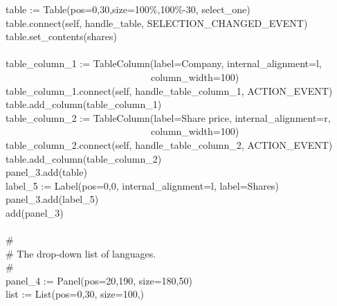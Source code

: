 {\>   \ \ \ table :=
Table({\textquotedbl}pos=0,30{\textquotedbl},{\textquotedbl}size=100\%,100\%-30{\textquotedbl},
{\textquotedbl}select\_one{\textquotedbl}) \\
\>   \ \ \ table.connect(self,
{\textquotedbl}handle\_table{\textquotedbl},
SELECTION\_CHANGED\_EVENT) \\
\>   \ \ \ table.set\_contents(shares) \\
\ \\
\>   \ \ \ table\_column\_1 :=
TableColumn({\textquotedbl}label=Company{\textquotedbl},
{\textquotedbl}internal\_alignment=l{\textquotedbl}, \\
\>   \ \ \ \ \ \ \ \ \ \ \ \ \ \ \ \ \ \ \ \ \ \ \ \ \ \ \ \ \ \ \ \ \ {\textquotedbl}column\_width=100{\textquotedbl}) \\
\>   \ \ \ table\_column\_1.connect(self,
{\textquotedbl}handle\_table\_column\_1{\textquotedbl}, ACTION\_EVENT) \\
\>   \ \ \ table.add\_column(table\_column\_1) \\
\>   \ \ \ table\_column\_2 := TableColumn({\textquotedbl}label=Share
price{\textquotedbl},
{\textquotedbl}internal\_alignment=r{\textquotedbl}, \\
\>   \ \ \ \ \ \ \ \ \ \ \ \ \ \ \ \ \ \ \ \ \ \ \ \ \ \ \ \ \ \ \ \ \ {\textquotedbl}column\_width=100{\textquotedbl}) \\
\>   \ \ \ table\_column\_2.connect(self,
{\textquotedbl}handle\_table\_column\_2{\textquotedbl}, ACTION\_EVENT) \\
\>   \ \ \ table.add\_column(table\_column\_2) \\
\>   \ \ \ panel\_3.add(table) \\
\>   \ \ \ label\_5 := Label({\textquotedbl}pos=0,0{\textquotedbl},
{\textquotedbl}internal\_alignment=l{\textquotedbl},
{\textquotedbl}label=Shares{\textquotedbl}) \\
\>   \ \ \ panel\_3.add(label\_5) \\
\>   \ \ \ add(panel\_3) \\
\ \\
\>   \ \ \ \# \\
\>   \ \ \ \# The drop-down list of languages. \\
\>   \ \ \ \# \\
\>   \ \ \ panel\_4 := Panel({\textquotedbl}pos=20,190{\textquotedbl},
{\textquotedbl}size=180,50{\textquotedbl}) \\
\>   \ \ \ list := List({\textquotedbl}pos=0,30{\textquotedbl},
{\textquotedbl}size=100,{\textquotedbl}) \\
}
